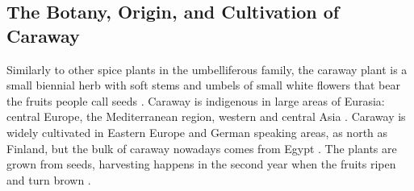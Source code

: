 

\subsection{The Botany, Origin, and  Cultivation of Caraway}

Similarly to other spice plants in the umbelliferous family, the caraway plant is a small biennial herb with soft stems and umbels of small white flowers that bear the fruits people call seeds \autocite[100]{van_wyk_culinary_2014}. Caraway is indigenous in large areas of Eurasia: central Europe, the Mediterranean region, western and central Asia \autocite{mabberley_mabberleys_2017}. 
Caraway is widely cultivated in Eastern Europe and German speaking areas, as north as Finland, but the bulk of caraway nowadays comes from Egypt \autocite{farrell_spices_1985}. The plants are grown from seeds, harvesting happens in the second year when the fruits ripen and turn brown \autocite{van_wyk_culinary_2014}.

